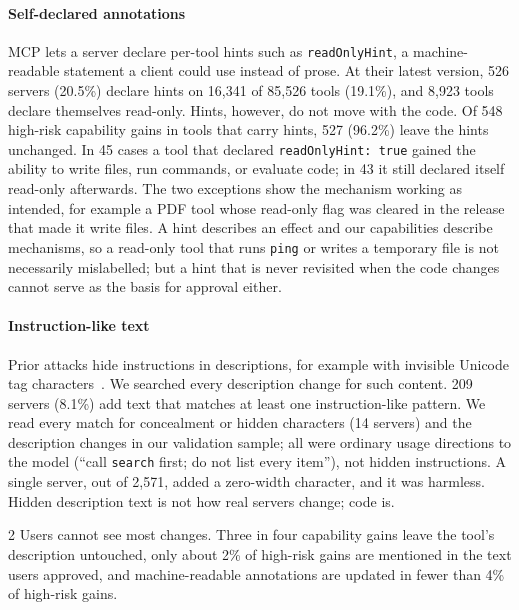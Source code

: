 \paragraph{Self-declared annotations}
MCP lets a server declare per-tool hints such as \texttt{readOnlyHint}, a machine-readable statement a client could use instead of prose. At their latest version, 526 servers (20.5\%) declare hints on 16,341 of 85,526 tools (19.1\%), and 8,923 tools declare themselves read-only. Hints, however, do not move with the code. Of 548 high-risk capability gains in tools that carry hints, 527 (96.2\%) leave the hints unchanged. In 45 cases a tool that declared \texttt{readOnlyHint: true} gained the ability to write files, run commands, or evaluate code; in 43 it still declared itself read-only afterwards. The two exceptions show the mechanism working as intended, for example a PDF tool whose read-only flag was cleared in the release that made it write files. A hint describes an effect and our capabilities describe mechanisms, so a read-only tool that runs \texttt{ping} or writes a temporary file is not necessarily mislabelled; but a hint that is never revisited when the code changes cannot serve as the basis for approval either.

\paragraph{Instruction-like text}
Prior attacks hide instructions in descriptions, for example with invisible Unicode tag characters~\cite{unicodetag2026}. We searched every description change for such content. 209 servers (8.1\%) add text that matches at least one instruction-like pattern. We read every match for concealment or hidden characters (14 servers) and the description changes in our validation sample; all were ordinary usage directions to the model (``call \texttt{search} first; do not list every item''), not hidden instructions. A single server, out of 2,571, added a zero-width character, and it was harmless. Hidden description text is not how real servers change; code is.

\begin{finding}{2}
Users cannot see most changes. Three in four capability gains leave the tool's description untouched, only about 2\% of high-risk gains are mentioned in the text users approved, and machine-readable annotations are updated in fewer than 4\% of high-risk gains.
\end{finding}
